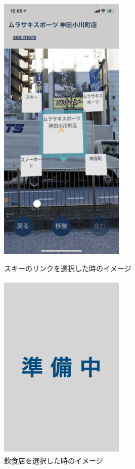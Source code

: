 \begin{figure}[h]
  \begin{minipage}{0.5\hsize}
    \centering
    \includegraphics[width=60mm]{images/ar_navigation_jibotyo_ski.png}
    \caption{スキーのリンクを選択した時のイメージ} \label{fig:ar_navigation_jibotyo_ski}
  \end{minipage}
  \begin{minipage}{0.5\hsize}
    \centering
    \includegraphics[width=60mm]{images/wip2.jpg}
    \caption{飲食店を選択した時のイメージ} \label{fig:ar_navigation_jibotyo_lunch}
  \end{minipage}
\end{figure}


